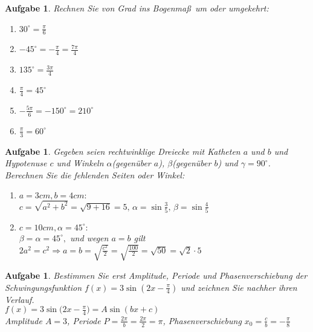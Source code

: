 \documentclass[12pt]{article}
\newtheorem{exercise}[satz]{Aufgabe}
\begin{document}
   \begin{exercise}
  Rechnen Sie von Grad ins Bogenma\ss \, um oder umgekehrt:
  \begin{multicols}{2}
  \begin{enumerate}
  \item[(a)] $30^\circ = \frac{\pi}{6}$
  \item[(b)] $-45^\circ = -\frac{\pi}{4} = \frac{7\pi}{4}$
  \item[(c)] $135^\circ =\frac{3\pi}{4}$
  \item[(d)] $\frac{\pi}{4} = 45^\circ$
  \item[(e)] $-\frac{5\pi}{6} = -150^\circ = 210^\circ$
  \item[(f)] $\frac{\pi}{3} = 60^\circ$
  \end{enumerate}
  \end{multicols}
   \end{exercise}

   \begin{exercise}
  Gegeben seien rechtwinklige Dreiecke mit Katheten $a$ und $b$ und Hypotenuse $c$ und Winkeln $\alpha$(gegen\"uber $a$), $\beta$(gegen\"uber $b$) und $\gamma = 90^\circ$. Berechnen Sie die fehlenden Seiten oder Winkel:
  \begin{enumerate}
  \item[(a)] $a = 3cm, b = 4cm:$\\
  $c=\sqrt{a^2+b^2} = \sqrt{9+16} = 5, \,\alpha = \sin{\frac{3}{5}}, \,\beta = \sin{\frac{4}{5}}$
\item[(b)] $c = 10cm, \alpha = 45^\circ:$\\
$\beta = \alpha = 45^\circ,$ und wegen $a = b $ gilt $2a^2 = c^2 \Rightarrow a = b = \sqrt{\frac{c^2}{2}} = \sqrt{\frac{100}{2}} = \sqrt{50} = \sqrt{2} \cdot 5$ 
  \end{enumerate}
   \end{exercise}

    \begin{exercise}
  Bestimmen Sie erst Amplitude, Periode und Phasenverschiebung der Schwingungsfunktion $f(x) = 3 \sin{(2x-\frac{\pi}{4})}$ und zeichnen Sie nachher ihren Verlauf.\\
  $f(x) = 3 \sin{(2x-\frac{\pi}{4}})= A \sin{(bx+c)}$\\
  Amplitude $A=3$, Periode $P = \frac{2\pi}{b} = \frac{2\pi}{2} = \pi$, Phasenverschiebung $x_0 = \frac{c}{b} = -\frac{\pi}{8}$
  \end{exercise}
\end{document}
